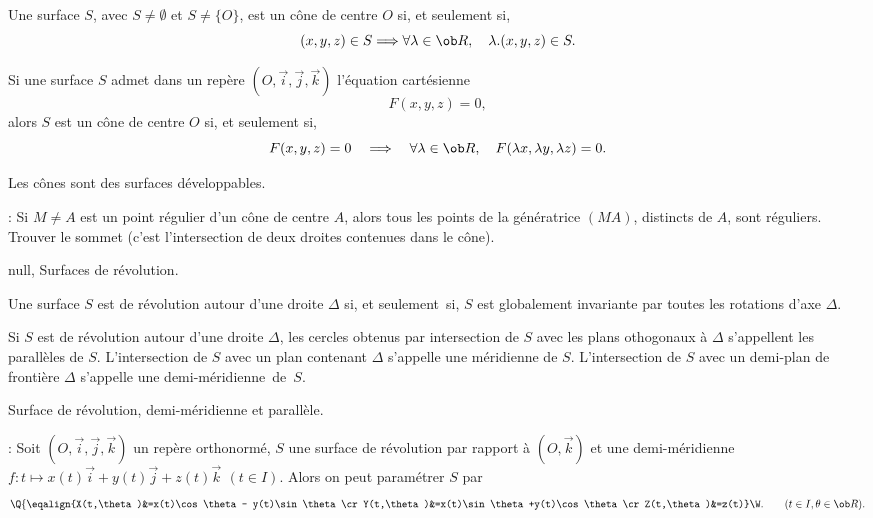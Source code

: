Une surface $S$, avec $S\neq\emptyset$ et $S\neq\{O\}$, est un cône de centre $O$ si, et seulement si, 
$$
(x,y,z)\in S\Longrightarrow \forall\lambda\in\ob R,\quad \lambda.(x,y,z)\in S.
$$

\Propriete [] Si une surface $S$ admet dans un repère $(O,\vec i,\vec j,\vec k)$ 
l'équation cartésienne  
$$
F(x,y,z)=0,
$$
alors $S$ est un cône de centre $O$ si, et seulement si, 
$$
F(x,y,z)=0\quad\Longrightarrow\quad \forall\lambda\in\ob R,\quad F(\lambda x,\lambda y,\lambda z)=0. 
$$

\Propriete 
Les cônes sont des surfaces développables. 

\Remarque : Si $M\neq A$ est un point régulier d'un cône de centre $A$, alors 
tous les points de la génératrice $(MA)$, distincts de $A$, sont réguliers. 
\bigskip
{}Trouver le sommet (c'est l'intersection de deux droites contenues dans le cône). 
\bigskip

\Subsection null, Surfaces de révolution.

\Definition [] Une surface $S$ est de révolution autour d'une droite $\Delta$ si, 
et seulement~si, 
$S$ est globalement invariante par toutes les rotations d'axe $\Delta$. 


\Definition [] Si $S$ est de révolution autour d'une droite $\Delta$, 
les cercles obtenus par intersection de $S$ avec les plans othogonaux à $\Delta$ s'appellent les parallèles de $S$. 
\pn
L'intersection de $S$ avec un plan contenant $\Delta$ s'appelle une méridienne de $S$. \pn
L'intersection de $S$ avec un demi-plan de frontière $\Delta$ s'appelle 
une demi-méridienne~de~$S$.

\centerline{%
}%
\Figure [Index=Surfaces!de revolution@de révolution]  Surface de révolution, demi-méridienne et parallèle.
\bigskip

\Remarque : Soit $(O,\vec i,\vec j,\vec k)$ un repère orthonormé, 
$S$ une surface de révolution par rapport à $(O,\vec k)$ 
et une demi-méridienne $f:t\mapsto x(t)\vec i+y(t)\vec j+z(t)\vec k\ \,(t\in I)$. 
Alors on peut paramétrer $S$ par 
$$\Q\{\eqalign{X(t,\theta)&=x(t)\cos\theta- y(t)\sin\theta\cr
Y(t,\theta)&=x(t)\sin\theta+y(t)\cos\theta \cr
Z(t,\theta)&=z(t)}\W.\qquad(t\in I,\theta\in\ob R).
$$


